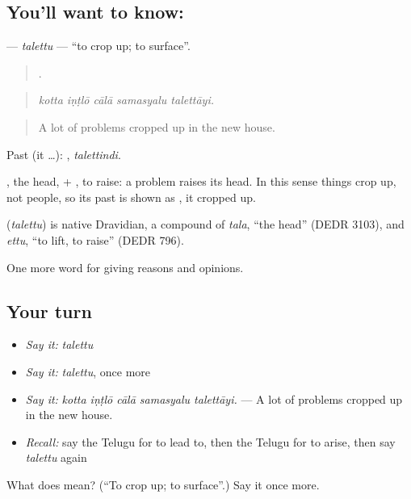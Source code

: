 \subsection*{You'll want to know: }
\textbf{} — \emph{talettu} — \textquotedblleft{}to crop up; to surface\textquotedblright{}.

\begin{quote}
    .
\end{quote}

\begin{quote}
\emph{kotta iṇṭlō cālā samasyalu talettāyi.}
\end{quote}

\begin{quote}
A lot of problems cropped up in the new house.
\end{quote}

Past (it …): , \emph{talettindi}.

, the head, + , to raise: a problem raises its head. In this sense things crop up, not people, so its past is shown as , it cropped up.

\begin{cousinweb}
\textbf{} (\emph{talettu}) is native Dravidian, a compound of \emph{tala}, \textquotedblleft{}the head\textquotedblright{} (DEDR 3103), and \emph{ettu}, \textquotedblleft{}to lift, to raise\textquotedblright{} (DEDR 796).
\end{cousinweb}

\begin{grammarlens}[title={What you've built}]
One more word for giving reasons and opinions.
\end{grammarlens}

\subsection*{Your turn}
\begin{itemize}
\raggedright
  \item \emph{Say it:} \emph{talettu}
  \item \emph{Say it:} \emph{talettu}, once more
  \item \emph{Say it:} \emph{kotta iṇṭlō cālā samasyalu talettāyi.} — A lot of problems cropped up in the new house.
  \item \emph{Recall:} say the Telugu for to lead to, then the Telugu for to arise, then say \emph{talettu} again
\end{itemize}

\begin{tcolorbox}[breakable,colback=teal!4,colframe=teal!35!black,title={Before you move on}]
What does  mean? (\textquotedblleft{}To crop up; to surface\textquotedblright{}.) Say it once more.
\end{tcolorbox}
